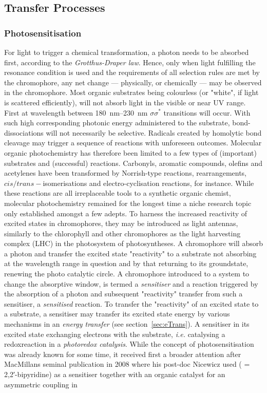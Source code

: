 		\subsection{Transfer Processes}
		\label{sec:ET}
			\subsubsection{Photosensitisation} %
			For light to trigger a chemical transformation, a photon needs to be absorbed first, according to the \emph{Grotthus-Draper law}. Hence, only when light fulfilling the resonance condition is used and the requirements of all selection rules are met by the chromophore, any net change --- physically, or chemically --- may be observed in the chromophore. Most organic substrates being colourless (or "white", if light is scattered efficiently), will not absorb light in the visible or near UV range. First at wavelength between \qtyrange{180}{230}{\nm} $\sigma\sigma^{\ast}$ transitions  will occur. With such high corresponding photonic energy administered to the substrate, bond-dissociations will not necessarily be selective. Radicals created by homolytic bond cleavage may trigger a sequence of reactions with unforeseen outcomes. Molecular organic photochemistry has therefore been limited to a few types of (important) substrates and (successful) reactions. Carbonyls, aromatic compounds, olefins and acetylenes have been transformed by Norrish-type reactions, rearrangements, $cis/trans-$isomerisations and electro-cyclisation reactions, for instance. While these reactions are all irreplaceable tools to a synthetic organic chemist, molecular photochemistry remained for the longest time a niche research topic only established amongst a few adepts. To harness the increased reactivity of excited states in chromophores, they may be introduced as light antennas, similarly to the chlorophyll and other chromophores as the light harvesting complex (LHC) in the photosystem of photosyntheses. A chromophore will absorb a photon and transfer the excited state "reactivity" to a substrate not absorbing at the wavelength range in question and by that returning to its groundstate, renewing the photo catalytic circle. A chromophore introduced to a system to change the absorptive window, is termed a \emph{sensitiser} and a reaction triggered by the absorption of a photon and subsequent "reactivity" transfer from such a sensitiser, a \emph{sensitised} reaction. To transfer the "reactivity" of an excited state to a substrate, a sensitiser may transfer its excited state energy by various mechanisms in an \emph{energy transfer} (see section~\ref{sec:eTrans}). A sensitiser in its excited state exchanging electrons with the substrate, \textit{i.e.} catalysing a redoxreaction in a \emph{photoredox catalysis}. While the concept of photosensitisation was already known for some time, it received first a broader attention after MacMillans seminal publication in 2008 where his post-doc Nicewicz used  ( = 2,2′-bipyridine) as a sensitiser together with an organic catalyst for an asymmetric  coupling in 